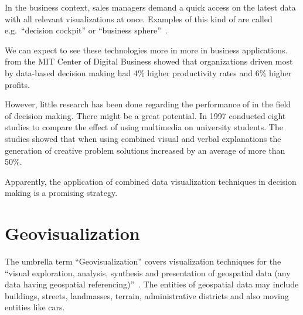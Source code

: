 In the business context, sales managers demand a quick access on the latest data with all relevant visualizations at once.
Examples of this kind of \dss{} are called e.g.\ ``decision cockpit'' or ``business sphere''~\parencite{Davenport2013}.

We can expect to see these technologies more in more in business applications.
\textcite{McAfee2012} from the MIT Center of Digital Business showed that organizations driven most by data-based decision making had 4\% higher productivity rates and 6\% higher profits.

However, little research has been done regarding the performance of \cmvs{} in the field of decision making.
There might be a great potential.
In 1997 \textcite{Mayer1997} conducted eight studies to compare the effect of using multimedia on university students.
The studies showed that when using combined visual and verbal explanations the generation of creative problem solutions increased by an average of more than 50\%.

Apparently, the application of combined data visualization techniques in decision making is a promising strategy.


\section{Geovisualization}
The umbrella term ``Geovisualization'' covers visualization techniques for the ``visual exploration, analysis, synthesis and presentation of geospatial data (any data having geospatial  referencing)''~\parencite{Maceachren2001}.
The entities of geospatial data may include buildings, streets, landmasses, terrain, administrative districts and also moving entities like cars.

